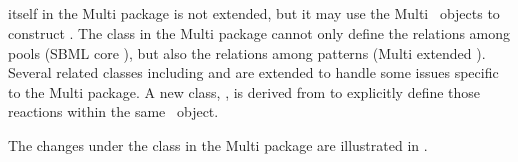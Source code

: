 \clearpage

\subsection{}
\label{def:ExReaction}


 itself in the Multi package is not extended, but it may use the Multi \ExSpecies\ objects to construct \reactions. The  class in the Multi package cannot only define the relations among pools (SBML core \species), but also the relations among patterns (Multi extended \species). Several related classes including \ExSimpleSpeciesReference and \ExSpeciesReference are extended to handle some issues specific to the Multi package. A new class, \IntraSpeciesReaction, is derived from  to explicitly define those reactions within the same \ExSpecies\ object.

The changes under the  class in the Multi package are illustrated in . 

